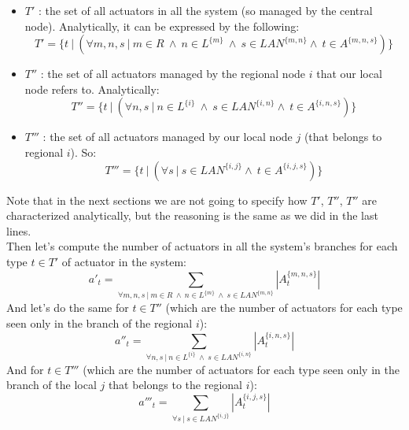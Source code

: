 \documentclass[11pt]{article}
\begin{document}
\begin{itemize}
    \item $T'$ : the set of all actuators in all the system (so managed by the central node). Analytically, it can be expressed by the following:
    \begin{equation}
        T' = \{ t \ | \ (\forall m,n,s \ | \ m \in R \ \land \ n \in L^{\{m\}} \ \land \ s \in LAN^{\{m, n\}} \land \ t \in A^{\{m,n,s\}}) \}
    \end{equation}
    \item $T''$ : the set of all actuators managed by the regional node $i$ that our local node refers to. Analytically:
    \begin{equation}
        T'' = \{ t \ | \ (\forall n,s \ | \ n \in L^{\{i\}} \ \land \ s \in LAN^{\{i, n\}} \land \ t \in A^{\{i, n,s\}}) \}
    \end{equation}
    \item $T'''$ : the set of all actuators managed by our local node $j$ (that belongs to regional $i$). So:
    \begin{equation}
        T''' = \{ t \ | \ (\forall s \ | \ s \in LAN^{\{i, j\}} \land \ t \in A^{\{i,j,s\}}) \}
    \end{equation}
\end{itemize}

Note that in the next sections we are not going to specify how $T'$, $T''$, $T''$ are characterized analytically, but the reasoning is the same as we did in the last lines. \\

Then let's compute the number of actuators in all the system's branches for each type $t \in T'$ of actuator in the system:
\begin{equation}
    a'_{t} = \sum_{\forall m,n,s \ | \ m \in R \ \land \ n \in L^{\{m\}} \ \land \ s \in LAN^{\{m, n\}}}{ |A^{\{m, n, s\}}_{t}| }
\end{equation}
And let's do the same for $t \in T''$ (which are the number of actuators for each type seen only in the branch of the regional $i$):
\begin{equation}
    a''_{t} = \sum_{\forall n,s \ | \ n \in L^{\{i\}} \ \land \ s \in LAN^{\{i, n\}}}{ |A^{\{i, n, s\}}_{t}| }
\end{equation}
And for $t \in T'''$ (which are the number of actuators for each type seen only in the branch of the local $j$ that belongs to the regional $i$):
\begin{equation}
    a'''_{t} = \sum_{\forall s \ | \ s \in LAN^{\{i, j\}}}{ |A^{\{i, j, s\}}_{t}| }
\end{equation}
\end{document}
